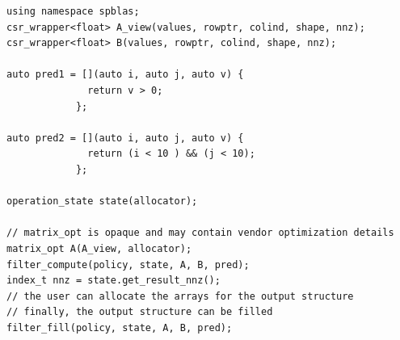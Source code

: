 \begin{listing}[H]
\caption{Predicate Selection, $B = A.*(A>0)$.}
\begin{verbatim}
using namespace spblas;
csr_wrapper<float> A_view(values, rowptr, colind, shape, nnz);
csr_wrapper<float> B(values, rowptr, colind, shape, nnz);

auto pred1 = [](auto i, auto j, auto v) {
              return v > 0;
            };

auto pred2 = [](auto i, auto j, auto v) {
              return (i < 10 ) && (j < 10);
            };

operation_state state(allocator);
           
// matrix_opt is opaque and may contain vendor optimization details
matrix_opt A(A_view, allocator);
filter_compute(policy, state, A, B, pred);
index_t nnz = state.get_result_nnz();
// the user can allocate the arrays for the output structure
// finally, the output structure can be filled
filter_fill(policy, state, A, B, pred); 
\end{verbatim}
\end{listing}



